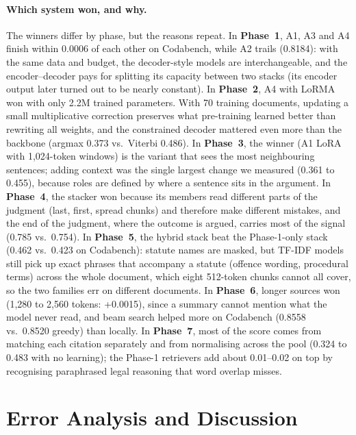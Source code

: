 \documentclass[11pt, oneside]{article}
\begin{document}
\paragraph{Which system won, and why.}  The winners differ by phase, but the reasons repeat.  In
\textbf{Phase~1}, A1, A3 and A4 finish within 0.0006 of each other on Codabench, while A2 trails (0.8184): with
the same data and budget, the decoder-style models are interchangeable, and the encoder--decoder pays for
splitting its capacity between two stacks (its encoder output later turned out to be nearly constant).  In
\textbf{Phase~2}, A4 with LoRMA won with only 2.2M trained parameters.  With 70 training documents, updating a
small multiplicative correction preserves what pre-training learned better than rewriting all weights, and
the constrained decoder mattered even more than the backbone (argmax 0.373 vs.\ Viterbi 0.486).  In
\textbf{Phase~3}, the winner (A1 LoRA with 1,024-token windows) is the variant that sees the most neighbouring
sentences; adding context was the single largest change we measured (0.361 to 0.455), because roles are defined
by where a sentence sits in the argument.  In \textbf{Phase~4}, the stacker won because its members read
different parts of the judgment (last, first, spread chunks) and therefore make different mistakes, and the
end of the judgment, where the outcome is argued, carries most of the signal (0.785 vs.\ 0.754).  In
\textbf{Phase~5}, the hybrid stack beat the Phase-1-only stack (0.462 vs.\ 0.423 on Codabench): statute names are
masked, but TF-IDF models still pick up exact phrases that accompany a statute (offence wording, procedural
terms) across the whole document, which eight 512-token chunks cannot all cover, so the two families err on
different documents.  In \textbf{Phase~6}, longer sources won (1,280 to 2,560 tokens: +0.0015), since a
summary cannot mention what the model never read, and beam search helped more on Codabench (0.8558 vs.\ 0.8520
greedy) than locally.  In \textbf{Phase~7}, most of the score comes from matching each citation separately and
from normalising across the pool (0.324 to 0.483 with no learning); the Phase-1 retrievers add about 0.01--0.02
on top by recognising paraphrased legal reasoning that word overlap misses.

\section{Error Analysis and Discussion}
\end{document}

